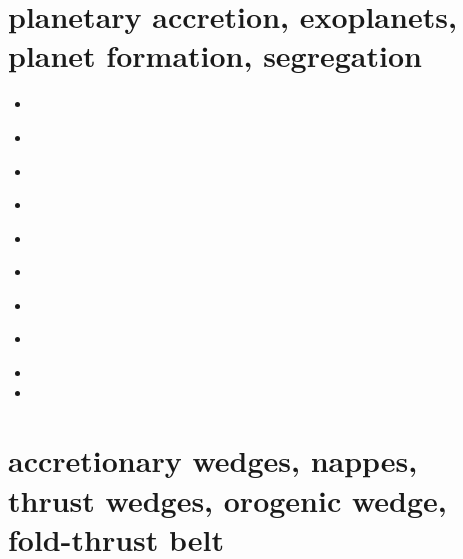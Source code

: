\section{planetary accretion, exoplanets, planet formation, segregation}

\begin{small}
\begin{itemize}
\item[\twothousandeight] 
\item[\twothousandnine] 
\\
\item[\twothousandten] 
\item[\twothousandeleven] 
\\
\item[\twothousandthirteen] 
\item[\twothousandfourteen] 
\\
\item[\twothousandfifteen] 
\item[\twothousandnineteen] 
\\
\item[\twothousandtwenty] 
\item[\twothousandtwentytwo] 
\end{itemize}
\end{small}

\section{accretionary wedges, nappes, thrust wedges, orogenic wedge, fold-thrust belt} 

